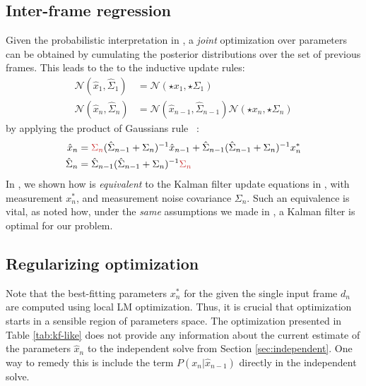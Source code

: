 \subsection{Inter-frame regression} 
\label{sec:combining}
Given the probabilistic interpretation in , a \emph{joint} optimization over parameters can be obtained by cumulating the posterior distributions over the set of previous frames. This leads to the to the inductive update rules:
% 
\begin{align}
\mathcal{N}(\hat{x}_1, \hat{\Sigma}_1) &= \mathcal{N}(\star{x}_1, \star{\Sigma}_1) \\
\mathcal{N}(\hat{x}_n, \hat{\Sigma}_n) &= \mathcal{N}(\hat{x}_{n-1}, \hat{\Sigma}_{n-1}) \mathcal{N}(\star{x}_n, \star{\Sigma}_n)
\end{align}
% 
by applying the product of Gaussians rule ~\cite{petersen2008matrix}:
% 
\begin{align}
\begin{split}
\hat{x}_{n} &= \todo{\Sigma_{n}} (\hat{\Sigma}_{n-1} + \Sigma_{n})^{-1} \hat{x}_{n-1} + 
\hat{\Sigma}_{n-1} (\hat{\Sigma}_{n-1} + \Sigma_n)^{-1} x_n^*
\\
\hat{\Sigma}_n &= \hat{\Sigma}_{n-1} (\hat{\Sigma}_{n-1} + \Sigma_n)^{-1} \todo{\Sigma_n}
\label{eq:combining}
\end{split}
\end{align}
% 
In , we shown how  is \emph{equivalent} to the Kalman filter update equations in , with measurement $x_n^*$, and measurement noise covariance $\Sigma_n$. Such an equivalence is vital, as \cite{maybeck1979stochastic} noted how, under the \emph{same} assumptions we made in , a Kalman filter is optimal for our problem.



\subsection{Regularizing optimization}

Note that the best-fitting parameters $x_n^*$ for the given the single input frame $d_n$ are computed using local LM optimization. Thus, it is crucial that optimization starts in a sensible region of parameters space. The optimization presented in Table \ref{tab:kf-like} does not provide any information about the current estimate of the parameters $\hat{x}_n$ to the independent solve from Section \ref{sec:independent}. One way to remedy this is include the term $P(x_n |\hat{x}_{n - 1})$ directly in the independent solve.



